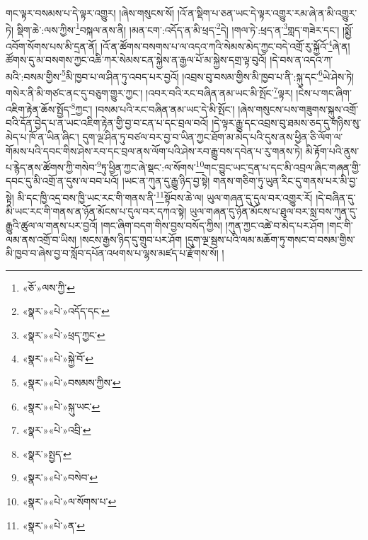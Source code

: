 གང་ལྟར་བསམས་པ་དེ་ལྟར་འགྱུར། །ཞེས་གསུངས་སོ། །འོ་ན་སྡིག་པ་ཅན་ཡང་དེ་ལྟར་འགྱུར་རམ་ཞེ་ན་མི་འགྱུར་ཏེ། སྡིག་ཆེ་:ལས་ཀྱིས་\footnote{«ཅོ་»ལས་ཀྱི་}བསྐལ་ནས་ནི། །མན་ངག་:འདོད་ན་མི་ཕྲད་\footnote{«སྣར་»«པེ་»འདོད་དང་}དེ། །གལ་ཏེ་:ཕྲད་ན་\footnote{«སྣར་»«པེ་»ཕྲད་ཀྱང་}གླད་གཟེར་དང་། །སྨྱོ་འབོག་སོགས་པས་མི་དྲན་ནོ། །འོ་ན་ཚོགས་བསགས་པ་ལ་འདའ་ཀའི་སེམས་མེད་ཀྱང་བདེ་འགྲོ་རུ་སྐྱོའོ་\footnote{«སྣར་»«པེ་»སྐྱེ་བོ་}ཞེ་ན། ཚོགས་དུ་མ་བསགས་ཀྱང་འཆི་ཀར་སེམས་ངན་སྐྱེས་ན་རྒྱལ་པོ་མ་སྐྱེས་དགྲ་ལྟ་བུའོ། །དེ་བས་ན་འདའ་ཀ་མའི་:བསམ་གྱིས་\footnote{«སྣར་»«པེ་»བསམས་ཀྱིས་}མི་ཁྱབ་པ་ལ་ཤིན་ཏུ་འབད་པར་བྱའོ། །འབྲས་བུ་བསམ་གྱིས་མི་ཁྱབ་པ་ནི་:སྐུ་དང་\footnote{«སྣར་»«པེ་»སྐུ་ཡང་}ཡེ་ཤེས་ཏེ། གསེར་ནི་མི་གཙང་ནང་དུ་བཅུག་གྱུར་ཀྱང་། །འབར་བའི་རང་བཞིན་ནམ་ཡང་མི་སྤོང་\footnote{«སྣར་»«པེ་»འབྲི་}ལྟར། །ངེས་པ་གང་ཞིག་འཇིག་རྟེན་ཆོས་སྤྱོད་\footnote{«སྣར་»སྤྱད་}ཀྱང་། །བསམ་པའི་རང་བཞིན་ནམ་ཡང་དེ་མི་སྤོང་། །ཞེས་གསུངས་པས་གཟུགས་སྐུས་འགྲོ་བའི་དོན་བྱེད་པ་ན་ཡང་འཇིག་རྟེན་གྱི་བྱ་བ་ངན་པ་དང་བྲལ་བའོ། །དེ་ལྟར་རྒྱུ་དང་འབྲས་བུ་ཐམས་ཅད་དུ་གཉིས་སུ་མེད་པ་ཁོ་ན་ཡིན་ཞིང་། དུག་ལྔ་ཤིན་ཏུ་བཙལ་བར་བྱ་བ་ཡིན་ཀྱང་ཐོག་མ་མེད་པའི་དུས་ནས་ཕྱིན་ཅི་ལོག་ལ་གོམས་པའི་དབང་གིས་ཤེས་རབ་དང་བྲལ་ནས་ལོག་པའི་ཤེས་རབ་རྒྱུ་བས་དབེན་པ་རུ་གནས་ཏེ། མི་རྟོག་པའི་ནུས་པ་རྙེད་ནས་ཚོགས་ཀྱི་གསེབ་\footnote{«སྣར་»«པེ་»བསེབ་}ཏུ་ཕྱིན་ཀྱང་ཞེ་སྡང་:ལ་སོགས་\footnote{«སྣར་»«པེ་»ལ་སོགས་པ་}གང་བྱུང་ཡང་དྲན་པ་དང་མི་འབྲལ་ཞིང་གཞན་གྱི་དབང་དུ་མི་འགྲོ་ན་དུས་ལ་བབ་པའོ། །ཡང་ན་ཀུན་དུ་རྒྱུ་ཉིད་བྱ་སྟེ། གནས་གཅིག་ཏུ་ཡུན་རིང་དུ་གནས་པར་མི་བྱ་སྟེ། མི་དང་ཁྱི་འདྲ་བས་ཁྱི་ཡང་རང་གི་གནས་ནི་\footnote{«སྣར་»«པེ་»ན་}སྟོབས་ཆེ་ལ། ཡུལ་གཞན་དུ་དུལ་བར་འགྱུར་རོ། །དེ་བཞིན་དུ་མི་ཡང་རང་གི་གནས་ན་ཉོན་མོངས་པ་དུལ་བར་དཀའ་སྟེ། ཡུལ་གཞན་དུ་ཉོན་མོངས་པ་ཐུལ་བར་སླ་བས་ཀུན་དུ་རྒྱུའི་ཚུལ་ལ་གནས་པར་བྱའོ། །གང་ཞིག་བདག་གིས་བྱས་བསོད་ཀྱིས། །ཀུན་ཀྱང་འཚེ་བ་མེད་པར་ཤོག །གང་གི་ལམ་ནས་འགྲོ་བ་ཡིས། །སངས་རྒྱས་ཉིད་དུ་གྲུབ་པར་ཤོག །དུག་ལྔ་སྦས་པའི་ལམ་མཆོག་ཏུ་གསང་བ་བསམ་གྱིས་མི་ཁྱབ་བ་ཞེས་བྱ་བ་སློབ་དཔོན་འཕགས་པ་ལྷས་མཛད་པ་རྫོགས་སོ། ། 